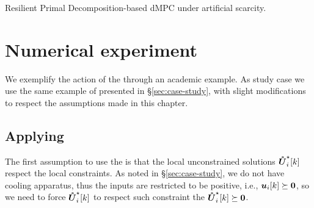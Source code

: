 \documentclass[../main.tex]{subfiles}
\begin{document}
\begin{algorithm2e}[h]
  \DontPrintSemicolon
 \caption{Resilient Primal Decomposition-based dMPC under artificial scarcity.}\label{alg:safeDMPC}
\end{algorithm2e}

\section{Numerical experiment}\label{sec:numerical-experiment-ineq}

We exemplify the action of the \rpdmpcas{} through an academic example.
As study case we use the same example of \dhn{} presented in \S\ref{sec:case-study}, with slight modifications to respect the assumptions made in this chapter.

\subsection{Applying \rpdmpcas{}}
The first assumption to use the \rpdmpcas{} is that the local unconstrained solutions $\optuncUik$ respect the local constraints.
As noted in \S\ref{sec:case-study}, we do not have cooling apparatus, thus the inputs are restricted to be positive, i.e., $\boldsymbol{u}_{i}[k]\succeq\mathbf{0}$, so
we need to force $\optuncUik$ to respect such constraint the $\optuncUik\succeq\0$.
\end{document}
